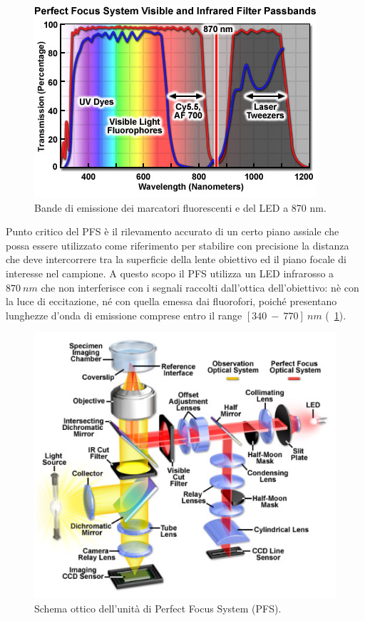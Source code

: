 \begin{figure}
 \centering
 \includegraphics[scale=.65]{img/CAP2bande.png}
 \caption{\small{Bande di emissione dei marcatori fluorescenti e del LED a 870 nm.}}
 \label{fig:bande}
\end{figure}

Punto critico del PFS è il rilevamento accurato di un certo piano assiale che possa essere utilizzato come riferimento per stabilire con precisione la distanza che deve intercorrere tra la superficie della lente obiettivo ed il piano focale di interesse nel campione. 
A questo scopo il PFS utilizza un LED infrarosso a $870\ nm$ che non interferisce con i segnali raccolti dall'ottica dell'obiettivo: nè con la luce di eccitazione, né con quella emessa dai fluorofori, poiché presentano lunghezze d'onda di emissione comprese entro il range $[340\ -\ 770]\ nm$ (\figurename~\ref{fig:bande}).

\begin{figure}
 \centering
 \includegraphics[scale=.70]{img/CAP2PFSschema.png}
 \caption{\small{Schema ottico dell'unità di Perfect Focus System (PFS).}}
 \label{fig:PFSschema}
\end{figure}

